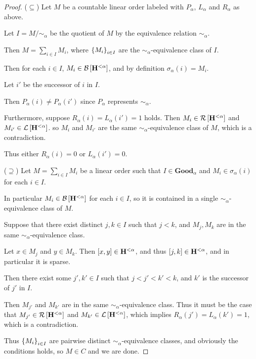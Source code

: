 \begin{proof}
  ($\subseteq$) Let $M$ be a countable linear order labeled with $P_\alpha$, $L_\alpha$ and $R_\alpha$ as above.

  Let $I = M / \sim_{\alpha}$ be the quotient of $M$ by the equivalence relation $\sim_{\alpha}$.

  Then $M = \sum_{i \in I} M_i$,
  where $\left\{ {M_i} \right\}_{i \in I}$ are the $\sim_{\alpha}$-equivalence class of $I$.

  Then for each $i \in I$, $M_i \in \mathcal{B} \left[ {\mathbf{H}^{< \alpha}} \right]$,
  and by definition $\sigma_\alpha(i) = M_i$.

  Let $i'$ be the successor of $i$ in $I$.

  Then $P_\alpha(i) \ne P_\alpha(i')$ since $P_\alpha$ represents $\sim_{\alpha}$.

  Furthermore, suppose $R_\alpha(i) = L_\alpha(i') = 1$ holds.
  Then $M_i \in \mathcal{R} \left[ {\mathbf{H}^{< \alpha}} \right]$ and $M_{i'} \in \mathcal{L} \left[ {\mathbf{H}^{< \alpha}} \right]$.
  so $M_i$ and $M_{i'}$ are the same $\sim_{\alpha}$-equivalence class of $M$,
  which is a contradiction.

  Thus either $R_\alpha(i) = 0$ or $L_\alpha(i') = 0$.

  ($\supseteq$) Let $M = \sum_{i \in I} M_i$ be a linear order
  such that $I \in \mathbf{Good}_{\alpha}$ and $M_i \in \sigma_\alpha(i)$ for each $i \in I$.

  In particular $M_i \in \mathcal{B} \left[ {\mathbf{H}^{< \alpha}} \right]$ for each $i \in I$, so it is contained
  in a single $\sim_{\alpha}$-equivalence class of $M$.

  Suppose that there exist distinct $j ,k \in I$ such that $j < k$, and
  $M_j, M_k$ are in the same $\sim_{\alpha}$-equivalence class.

  Let $x \in M_j$ and $y \in M_k$.
  Then $[x, y] \in \mathbf{H}^{< \alpha}$,
  and thus $[j, k] \in \mathbf{H}^{< \alpha}$,
  and in particular it is sparse.

  Then there exist some $j', k' \in I$ such that $j < j' < k' < k$,
  and $k'$ is the successor of $j'$ in $I$.

  Then $M_{j'}$ and $M_{k'}$ are in the same $\sim_{\alpha}$-equivalence class.
  Thus it must be the case that $M_{j'} \in \mathcal{R} \left[ {\mathbf{H}^{< \alpha}} \right]$ and $M_{k'} \in \mathcal{L} \left[ {\mathbf{H}^{< \alpha}} \right]$,
  which implies $R_\alpha(j') = L_\alpha(k') = 1$, which is a contradiction.

  Thus $\left\{ {M_i} \right\}_{i \in I}$ are pairwise distinct $\sim_{\alpha}$-equivalence classes,
  and obviously the conditions holds,
  so $M \in C$ and we are done.
\end{proof}

